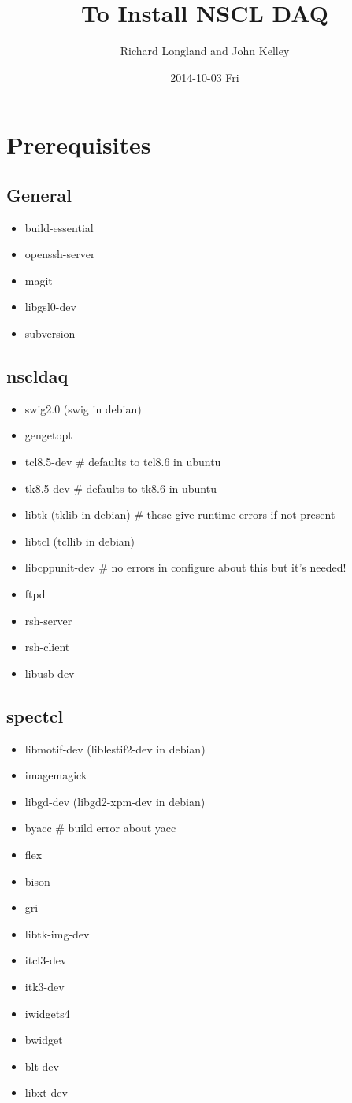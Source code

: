 \documentclass[11pt]{article}
\author{Richard Longland and John Kelley}
\date{2014-10-03 Fri}
\title{To Install NSCL DAQ}
\begin{document}
\maketitle


\section*{Prerequisites}
\label{sec-1}
\subsection*{General}
\label{sec-1-1}
\begin{itemize}
\item build-essential
\item openssh-server
\item magit
\item libgsl0-dev
\item subversion
\end{itemize}

\subsection*{nscldaq}
\label{sec-1-2}
\begin{itemize}
\item swig2.0 (swig in debian)
\item gengetopt
\item tcl8.5-dev         \# defaults to tcl8.6 in ubuntu
\item tk8.5-dev          \# defaults to tk8.6 in ubuntu
\item libtk    (tklib in debian)     \# these give runtime errors if not present
\item libtcl   (tcllib in debian)
\item libcppunit-dev  \# no errors in configure about this but it's needed!
\item ftpd
\item rsh-server
\item rsh-client
\item libusb-dev
\end{itemize}
\subsection*{spectcl}
\label{sec-1-3}
\begin{itemize}
\item libmotif-dev  (liblestif2-dev in debian)
\item imagemagick
\item libgd-dev  (libgd2-xpm-dev in debian)
\item byacc           \# build error about yacc
\item flex
\item bison
\item gri
\item libtk-img-dev
\item itcl3-dev
\item itk3-dev
\item iwidgets4
\item bwidget
\item blt-dev
\item libxt-dev
\end{itemize}
\end{document}
